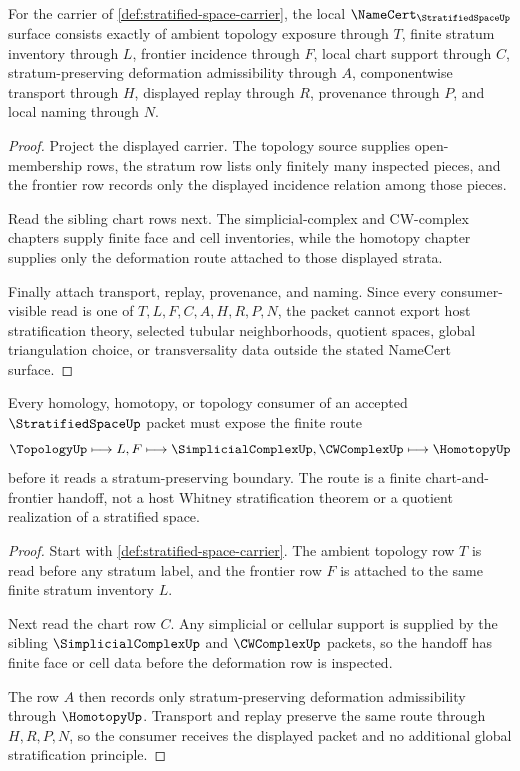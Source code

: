 \begin{theorem}
\label{thm:stratified-space-namecert-obligations}
For the carrier of \autoref{def:stratified-space-carrier}, the local $\NameCert_{\StratifiedSpaceUp}$ surface consists exactly of ambient topology exposure through $T$, finite stratum inventory through $L$, frontier incidence through $F$, local chart support through $C$, stratum-preserving deformation admissibility through $A$, componentwise transport through $H$, displayed replay through $R$, provenance through $P$, and local naming through $N$.
\end{theorem}
\begin{proof}
Project the displayed carrier. The topology source supplies open-membership rows, the stratum row lists only finitely many inspected pieces, and the frontier row records only the displayed incidence relation among those pieces.

Read the sibling chart rows next. The simplicial-complex and CW-complex chapters supply finite face and cell inventories, while the homotopy chapter supplies only the deformation route attached to those displayed strata.

Finally attach transport, replay, provenance, and naming. Since every consumer-visible read is one of $T,L,F,C,A,H,R,P,N$, the packet cannot export host stratification theory, selected tubular neighborhoods, quotient spaces, global triangulation choice, or transversality data outside the stated NameCert surface.
\end{proof}

\begin{theorem}
\label{thm:stratified-space-cellular-handoff}
Every homology, homotopy, or topology consumer of an accepted $\StratifiedSpaceUp$ packet must expose the finite route
$$
\TopologyUp \longmapsto L,F \longmapsto \SimplicialComplexUp,\CWComplexUp \longmapsto \HomotopyUp
$$
before it reads a stratum-preserving boundary. The route is a finite chart-and-frontier handoff, not a host Whitney stratification theorem or a quotient realization of a stratified space.
\end{theorem}
\begin{proof}
Start with \autoref{def:stratified-space-carrier}. The ambient topology row $T$ is read before any stratum label, and the frontier row $F$ is attached to the same finite stratum inventory $L$.

Next read the chart row $C$. Any simplicial or cellular support is supplied by the sibling $\SimplicialComplexUp$ and $\CWComplexUp$ packets, so the handoff has finite face or cell data before the deformation row is inspected.

The row $A$ then records only stratum-preserving deformation admissibility through $\HomotopyUp$. Transport and replay preserve the same route through $H,R,P,N$, so the consumer receives the displayed packet and no additional global stratification principle.
\end{proof}

